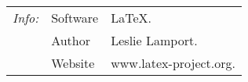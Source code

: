 \documentclass{article}
\begin{document}
\begin{tabular}{@{}>{\itshape}ll!{:}l<{.}@{}}
  \hline
  Info: & Software & \LaTeX\\
  & Author & Leslie Lamport\\
  & Website & www.latex-project.org\\
\hline
\end{tabular}
\end{document}

